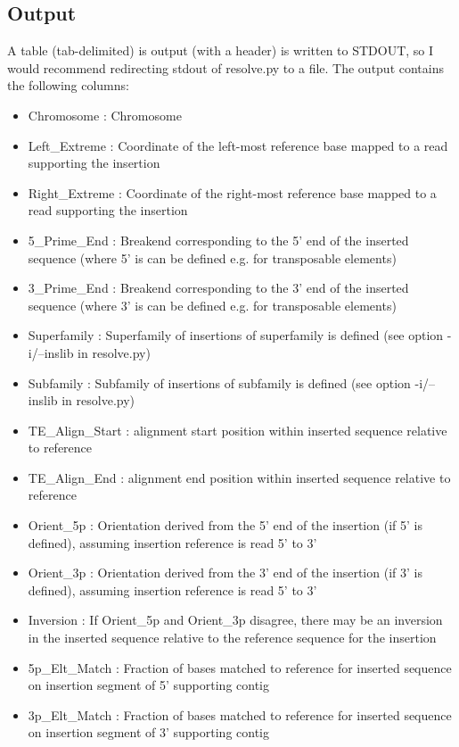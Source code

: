 \documentclass[letterpaper,11pt]{article}
\begin{document}
\subsection{Output}
A table (tab-delimited) is output (with a header) is written to STDOUT, so I would recommend redirecting stdout of resolve.py to a file. The output contains the following columns:

\begin{itemize}
\item Chromosome : Chromosome
\item Left\_Extreme : Coordinate of the left-most reference base mapped to a read supporting the insertion
\item Right\_Extreme : Coordinate of the right-most reference base mapped to a read supporting the insertion
\item 5\_Prime\_End : Breakend corresponding to the 5' end of the inserted sequence (where 5' is can be defined e.g. for transposable elements)
\item 3\_Prime\_End : Breakend corresponding to the 3' end of the inserted sequence (where 3' is can be defined e.g. for transposable elements)
\item Superfamily : Superfamily of insertions of superfamily is defined (see option -i/--inslib in resolve.py)
\item Subfamily : Subfamily of insertions of subfamily is defined (see option -i/--inslib in resolve.py)
\item TE\_Align\_Start : alignment start position within inserted sequence relative to reference
\item TE\_Align\_End : alignment end position within inserted sequence relative to reference
\item Orient\_5p : Orientation derived from the 5' end of the insertion (if 5' is defined), assuming insertion reference is read 5' to 3'
\item Orient\_3p : Orientation derived from the 3' end of the insertion (if 3' is defined), assuming insertion reference is read 5' to 3'
\item Inversion : If Orient\_5p and Orient\_3p disagree, there may be an inversion in the inserted sequence relative to the reference sequence for the insertion
\item 5p\_Elt\_Match : Fraction of bases matched to reference for inserted sequence on insertion segment of 5' supporting contig
\item 3p\_Elt\_Match : Fraction of bases matched to reference for inserted sequence on insertion segment of 3' supporting contig

\end{itemize}
\end{document}
